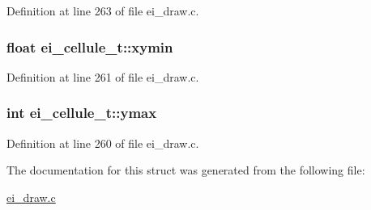Definition at line 263 of file ei\-\_\-draw.\-c.

\hypertarget{structei__cellule__t_a761ea1a88e22989260c847ce0a123fb6}{
\subsubsection[{xymin}]{\setlength{\rightskip}{0pt plus 5cm}float ei\-\_\-cellule\-\_\-t\-::xymin}}\label{structei__cellule__t_a761ea1a88e22989260c847ce0a123fb6}


Definition at line 261 of file ei\-\_\-draw.\-c.

\hypertarget{structei__cellule__t_ac8f000cde6f76158c7360bcac0345ba3}{
\subsubsection[{ymax}]{\setlength{\rightskip}{0pt plus 5cm}int ei\-\_\-cellule\-\_\-t\-::ymax}}\label{structei__cellule__t_ac8f000cde6f76158c7360bcac0345ba3}


Definition at line 260 of file ei\-\_\-draw.\-c.



The documentation for this struct was generated from the following file\-:\begin{DoxyCompactItemize}
\item 
\hyperlink{ei__draw_8c}{ei\-\_\-draw.\-c}\end{DoxyCompactItemize}
